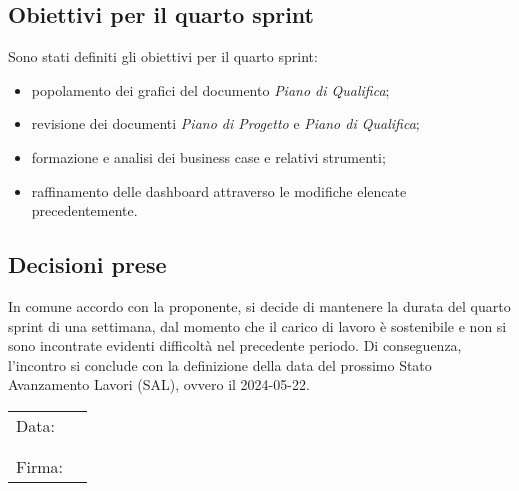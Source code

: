 \documentclass[italian,12pt]{article}
\begin{document}
\subsection{Obiettivi per il quarto sprint}
Sono stati definiti gli obiettivi per il quarto sprint:
\begin{itemize}
	\item popolamento dei grafici del documento \textit{Piano di Qualifica};
	\item revisione dei documenti \textit{Piano di Progetto} e \textit{Piano di Qualifica};
	\item formazione e analisi dei business case e relativi strumenti;
	\item raffinamento delle dashboard attraverso le modifiche elencate precedentemente.
\end{itemize}

\subsection{Decisioni prese}
In comune accordo con la proponente, si decide di mantenere la durata del quarto sprint di una settimana,
dal momento che il carico di lavoro è sostenibile e non si sono incontrate evidenti difficoltà nel precedente periodo.
Di conseguenza, l'incontro si conclude con la definizione della data del prossimo Stato Avanzamento Lavori (SAL),
ovvero il 2024-05-22.

\newpage
\begin{table}[b]
	\begin{tabular}{@{}p{.5in}p{4in}@{}}
		Data:  & \hrulefill \\
		       &            \\
		       &            \\
		Firma: & \hrulefill \\
	\end{tabular}
\end{table}
\end{document}
